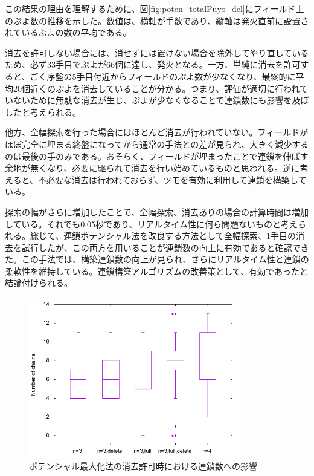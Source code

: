 \documentclass[12pt]{jreport}
\begin{document}
この結果の理由を理解するために、図\ref{fig:poten_totalPuyo_del}にフィールド上のぷよ数の推移を示した。数値は、横軸が手数であり、縦軸は発火直前に設置されているぷよの数の平均である。

消去を許可しない場合には、消せずには置けない場合を除外してやり直しているため、必ず33手目でぷよが66個に達し、発火となる。一方、単純に消去を許可すると、ごく序盤の5手目付近からフィールドのぷよ数が少なくなり、最終的に平均20個近くのぷよを消去していることが分かる。つまり、評価が適切に行われていないために無駄な消去が生じ、ぷよが少なくなることで連鎖数にも影響を及ぼしたと考えられる。

他方、全幅探索を行った場合にはほとんど消去が行われていない。フィールドがほぼ完全に埋まる終盤になってから通常の手法との差が見られ、大きく減少するのは最後の手のみである。おそらく、フィールドが埋まったことで連鎖を伸ばす余地が無くなり、必要に駆られて消去を行い始めているものと思われる。逆に考えると、不必要な消去は行われておらず、ツモを有効に利用して連鎖を構築している。

探索の幅がさらに増加したことで、全幅探索、消去ありの場合の計算時間は増加している。それでも0.05秒であり、リアルタイム性に何ら問題ないものと考えられる。総じて、連鎖ポテンシャル法を改良する方法として全幅探索、1手目の消去を試行したが、この両方を用いることが連鎖数の向上に有効であると確認できた。この手法では、構築連鎖数の向上が見られ、さらにリアルタイム性と連鎖の柔軟性を維持している。連鎖構築アルゴリズムの改善策として、有効であったと結論付けられる。


\begin{figure}[tb]
  \begin{center}
  \includegraphics[height=7cm]{experiment/Potential/KAI/graph/chain_del.png}
  \caption{ポテンシャル最大化法の消去許可時における連鎖数への影響} \label{fig:poten_chain_del}
\end{center}
\end{figure}
\end{document}
